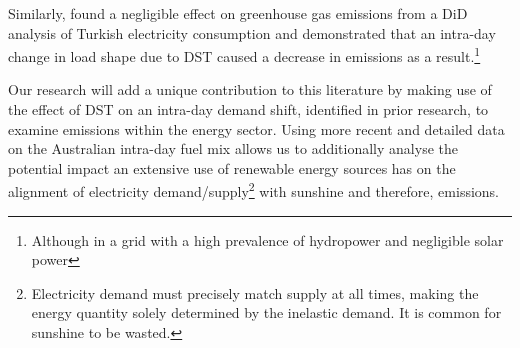 Similarly, \textcite{turkey} found a negligible effect on greenhouse gas emissions from a \ac{DiD} analysis of Turkish electricity consumption and demonstrated that an intra-day change in load shape due to \ac{DST} caused a decrease in emissions as a result.\footnote{Although in a grid with a high prevalence of hydropower and negligible solar power}

Our research will add a unique contribution to this literature by making use of the effect of \ac{DST} on an intra-day demand shift, identified in prior research, to examine emissions within the energy sector. Using more recent and detailed data on the Australian intra-day fuel mix allows us to additionally analyse the potential impact an extensive use of renewable energy sources has on the alignment of electricity demand/supply\footnote{Electricity demand must precisely match supply at all times, making the energy quantity solely determined by the inelastic demand. It is common for sunshine to be wasted.} with sunshine and therefore, emissions.

